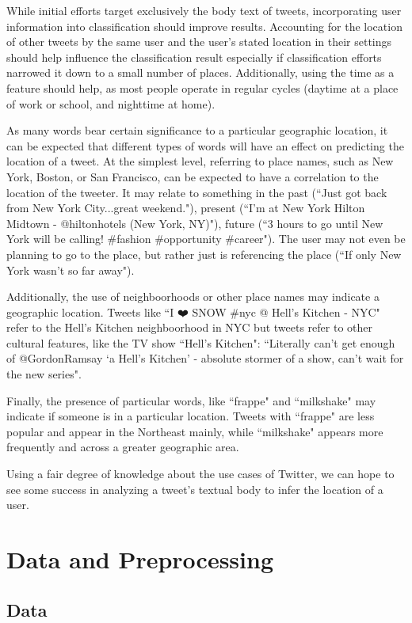 \documentclass[midd]{thesis}
\begin{document}
While initial efforts target exclusively the body text of tweets, incorporating user information into classification should improve results. Accounting for the location of other tweets by the same user and the user's stated location in their settings should help influence the classification result especially if classification efforts narrowed it down to a small number of places. Additionally, using the time as a feature should help, as most people operate in regular cycles (daytime at a place of work or school, and nighttime at home).

As many words bear certain significance to a particular geographic location, it can be expected that different types of words will have an effect on predicting the location of a tweet. At the simplest level, referring to place names, such as New York, Boston, or San Francisco, can be expected to have a correlation to the location of the tweeter. It may relate to something in the past (``Just got back from New York City...great weekend."), present (``I'm at New York Hilton Midtown - @hiltonhotels (New York, NY)"), future (``3 hours to go until New York will be calling! #fashion #opportunity #career"). The user may not even be planning to go to the place, but rather just is referencing the place (``If only New York wasn't so far away").

Additionally, the use of neighboorhoods or other place names may indicate a geographic location. Tweets like ``I ❤️ SNOW #nyc @ Hell's Kitchen - NYC" refer to the Hell's Kitchen neighboorhood in NYC but tweets refer to other cultural features, like the TV show ``Hell's Kitchen": ``Literally can't get enough of @GordonRamsay `a Hell's Kitchen' - absolute stormer of a show, can't wait for the new series".

Finally, the presence of particular words, like ``frappe" and ``milkshake" may indicate if someone is in a particular location. Tweets with ``frappe" are less popular and appear in the Northeast mainly, while ``milkshake" appears more frequently and across a greater geographic area.

Using a fair degree of knowledge about the use cases of Twitter, we can hope to see some success in analyzing a tweet's textual body to infer the location of a user.


\chapter{Data and Preprocessing}
\section{Data}
\end{document}
